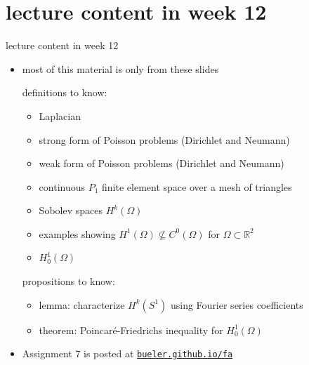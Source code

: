 \documentclass[10pt,
               svgnames,
               hyperref={colorlinks,
                         citecolor=DeepPink4,
                         linkcolor=FireBrick,
                         urlcolor=blue},
               usepdftitle=false]{beamer}
\newcommand{\RR}{\mathbb{R}}
\begin{document}
\section{lecture content in week 12}

\begin{frame}{lecture content in week 12}

\begin{itemize}
\item most of this material is \alert{only from these slides}

\begin{block}{definitions to know:}
\begin{itemize}
\item Laplacian
\item strong form of Poisson problems (Dirichlet and Neumann)
\item weak form of Poisson problems (Dirichlet and Neumann)
\item continuous $P_1$ finite element space over a mesh of triangles
\item Sobolev spaces $H^k(\Omega)$
\item examples showing $H^1(\Omega) \nsubseteq C^0(\Omega)$ for $\Omega \subset \RR^2$
\item $H_0^1(\Omega)$
\end{itemize}
\end{block}

\begin{block}{propositions to know:}
\begin{itemize}
\item lemma: characterize $H^k(S^1)$ using Fourier series coefficients
\item theorem: Poincar\'e-Friedrichs inequality for $H_0^1(\Omega)$
\end{itemize}
\end{block}

\item Assignment 7 is posted at \quad  \href{https://bueler.github.io/fa/index.html}{\texttt{bueler.github.io/fa}}
\end{itemize}
\end{frame}
\end{document}
